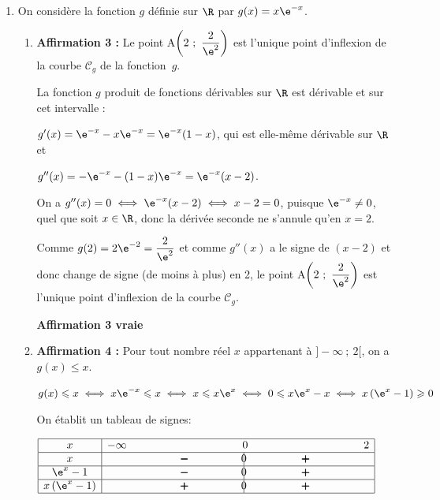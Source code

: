 \begin{enumerate}
\begin{enumerate}
 \hfill\textbf{Affirmation 2 fausse}
	\end{enumerate}
	
\item On considère la fonction $g$ définie sur $\R$ par $g(x) = x\e^{-x}$.
	\begin{enumerate}
	
		\item \textbf{Affirmation 3 :} 
\og  Le point A$\left(2~;~\dfrac{2}{\e^2}\right)$ est l'unique point d'inflexion de la courbe $\mathcal{C}_g$ de la fonction~$g$. \fg{} 

La fonction $g$ produit de fonctions dérivables sur $\R$ est dérivable et sur cet intervalle :

$g'(x) = \e^{-x} - x\e^{-x} = \e^{-x}(1 - x)$, qui est elle-même dérivable sur $\R$ et 

$g''(x) = -\e^{-x} - (1 - x)\e^{-x} = \e^{-x}(x - 2)$.

On a $g''(x) = 0 \iff \e^{-x}(x - 2) \iff x - 2 = 0$, puisque $\e^{-x} \ne 0$, quel que soit $x \in \R$, donc la dérivée seconde ne s'annule qu'en $x = 2$.

Comme $g(2) = 2\e^{-2} = \dfrac{2}{\e^2}$ et comme $g''(x)$ a le signe de $(x - 2)$ et donc change de signe (de moins à plus) en 2, le point A$\left(2~;~\dfrac{2}{\e^2}\right)$ est l'unique point d'inflexion de la courbe $\mathcal{C}_g$.

 \hfill\textbf{Affirmation 3 vraie}
 
		\item \textbf{Affirmation 4 :} 
\og  Pour tout nombre réel $x$ appartenant à $] - \infty~;~2[$, on a $g(x) \leqslant x$. \fg{} 

$g(x) \leqslant x \iff x\e^{-x} \leqslant x \iff x \leqslant x\e^{x} \iff 0 \leqslant x\e^{x}-x \iff x\left (\e^{x}-1\right )\geqslant 0$

On établit un tableau de signes:

\begin{center}
{
\def\esp{\hspace*{3cm}}
$\begin{array}{|c | *{5}{c} |} 
\hline
x  & -\infty & \esp & 0 & \esp  & 2 \\
\hline
x &  & \pmb{-} &  \vline\hspace{-2.7pt}{0} & \pmb{+} &   \\
\hline
\e^{x}-1 &  & \pmb{-} &  \vline\hspace{-2.7pt}{0} & \pmb{+} &   \\
\hline
x\left (\e^{x}-1\right ) &  & \pmb{+} &  \vline\hspace{-2.7pt}{0} & \pmb{+} &   \\
\hline
\end{array}$
}
\end{center}


\end{enumerate}
\end{enumerate}
